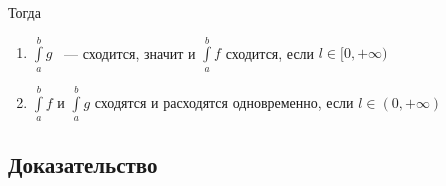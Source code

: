 \documentclass{article}
\begin{document}
\begin{enumerate}
\begin{itemize}
                            Тогда
                            
                            \begin{enumerate}
                            
                                \item $\int\limits^b_a g$ ~--- сходится, значит и $\int\limits^b_a f$ сходится, если $l \in [0, +\infty)$
                                
                                \item $\int\limits^b_a f$ и $\int\limits^b_a g$ сходятся и расходятся одновременно, если $l \in (0, +\infty)$
                                
                            \end{enumerate}
                        
                    \end{itemize}
                
            \end{enumerate}
        
        \subsection{Доказательство}
        
\end{document}
